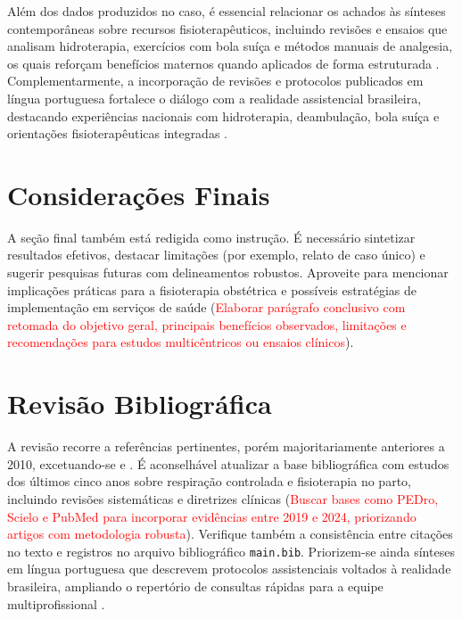 \documentclass[12pt,oneside,a4paper]{article}
\begin{document}
Além dos dados produzidos no caso, é essencial relacionar os achados às sínteses contemporâneas sobre recursos fisioterapêuticos, incluindo revisões e ensaios que analisam hidroterapia, exercícios com bola suíça e métodos manuais de analgesia, os quais reforçam benefícios maternos quando aplicados de forma estruturada \cite{melladogarcia2024,aslantas2023,smith2018}. Complementarmente, a incorporação de revisões e protocolos publicados em língua portuguesa fortalece o diálogo com a realidade assistencial brasileira, destacando experiências nacionais com hidroterapia, deambulação, bola suíça e orientações fisioterapêuticas integradas \cite{rocha2023,dantas2022,abreu2019,batista2023}.

\section*{Considerações Finais}
A seção final também está redigida como instrução. É necessário sintetizar resultados efetivos, destacar limitações (por exemplo, relato de caso único) e sugerir pesquisas futuras com delineamentos robustos. Aproveite para mencionar implicações práticas para a fisioterapia obstétrica e possíveis estratégias de implementação em serviços de saúde (\textcolor{red}{Elaborar parágrafo conclusivo com retomada do objetivo geral, principais benefícios observados, limitações e recomendações para estudos multicêntricos ou ensaios clínicos}).

\section*{Revisão Bibliográfica}
A revisão recorre a referências pertinentes, porém majoritariamente anteriores a 2010, excetuando-se  e \cite{sousa2021}. É aconselhável atualizar a base bibliográfica com estudos dos últimos cinco anos sobre respiração controlada e fisioterapia no parto, incluindo revisões sistemáticas e diretrizes clínicas (\textcolor{red}{Buscar bases como PEDro, Scielo e PubMed para incorporar evidências entre 2019 e 2024, priorizando artigos com metodologia robusta}). Verifique também a consistência entre citações no texto e registros no arquivo bibliográfico \texttt{main.bib}. Priorizem-se ainda sínteses em língua portuguesa que descrevem protocolos assistenciais voltados à realidade brasileira, ampliando o repertório de consultas rápidas para a equipe multiprofissional \cite{rocha2023,dantas2022,abreu2019,batista2023}.
\end{document}
